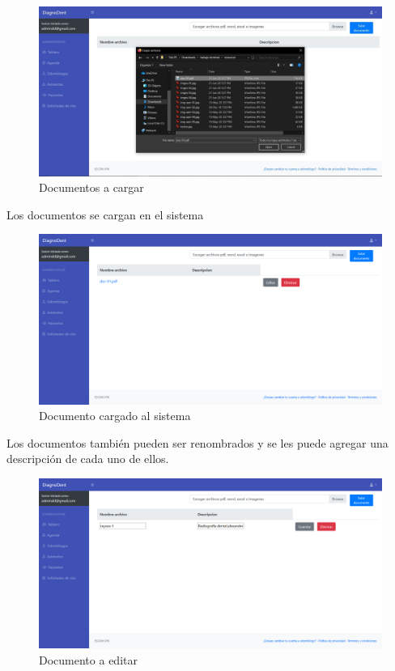 \begin{figure}[H]
\centering
\includegraphics[width=17cm,keepaspectratio]{pictures/adminodo/pacientes/documentos/lista-documentos-cargar.JPG}
\caption{Documentos a cargar}
\end{figure}

Los documentos se cargan en el sistema

\begin{figure}[H]
\centering
\includegraphics[width=17cm,keepaspectratio]{pictures/adminodo/pacientes/documentos/lista-documentos-2.png}
\caption{Documento cargado al sistema}
\end{figure}

Los documentos también pueden ser renombrados y se les puede agregar una descripción de cada uno de ellos.

\begin{figure}[H]
\centering
\includegraphics[width=17cm,keepaspectratio]{pictures/adminodo/pacientes/documentos/lista-documentos-editar.png}
\caption{Documento a editar}
\end{figure}

